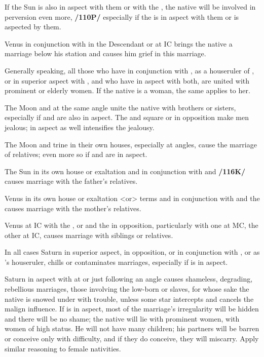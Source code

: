 If the Sun is also in aspect with them or with the \Moon, the native will be involved in perversion even more, \textbf{/110P/} especially if the \Moon\xspace is in aspect with them or is aspected by them. 

Venus in conjunction with \Saturn\xspace in the
Descendant or at IC brings the native a marriage below his station and causes him grief in this marriage. 

Generally speaking, all those who have \Venus\xspace in conjunction with \Saturn, as a houseruler of \Saturn, or in superior aspect with \Saturn, and who have \Jupiter\xspace in aspect with both, are united with prominent or elderly women. If the native is a woman, the same applies to her.

The Moon and \Venus\xspace at the same angle unite the native with brothers or sisters, especially if \Jupiter\xspace
and \Mars\xspace are also in aspect. The \Moon\xspace and \Venus\xspace square or in opposition make men jealous; \Mars\xspace in aspect as well intensifies the jealousy. 

The Moon and \Venus\xspace trine in their own houses, especially at angles, cause the marriage of relatives; even more so if \Mars\xspace and \Jupiter\xspace are in aspect. 

The Sun in its own house or exaltation and in conjunction with \Jupiter\xspace and \Venus\xspace \textbf{/116K/} causes marriage with the father’s relatives. 

Venus in its own house or exaltation <or> terms and in conjunction with \Mercury\xspace and the \Moon\xspace
causes marriage with the mother’s relatives. 

Venus at IC with the \Moon, or \Venus\xspace and the \Moon\xspace in opposition, particularly with one at MC, the other at IC, causes marriage with siblings or relatives.

In all cases Saturn in superior aspect, in opposition, or in conjunction with \Venus, or as \Venus’s houseruler, chills or contaminates marriages, especially if \Mercury\xspace is in aspect. 

Saturn in aspect with \Venus\xspace at or just following an angle causes shameless, degrading, rebellious marriages, those involving the low-born or slaves, for whose sake the native is snowed under with trouble, unless some star intercepts and cancels the malign influence. If \Jupiter\xspace is in aspect, most of the marriage’s irregularity will be hidden and there will be no shame; the native will lie with prominent women, with women of high status. He will not have many children; his partners will be barren or conceive only with difficulty, and if they do conceive, they will miscarry. Apply similar reasoning to female nativities.

